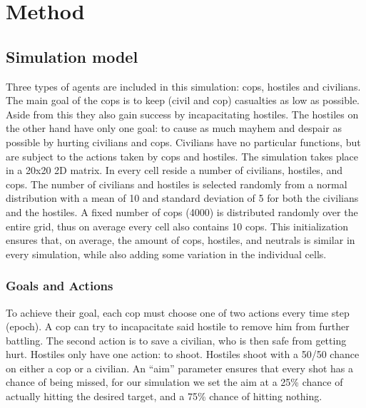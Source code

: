 \section{Method}
\subsection{Simulation model}
Three types of agents are included in this simulation: cops, hostiles and civilians.
The main goal of the cops is to keep (civil and cop) casualties as low as possible. Aside from this they also gain success by incapacitating hostiles.
The hostiles on the other hand have only one goal: to cause as much mayhem and despair as possible by hurting civilians and cops.
Civilians have no particular functions, but are subject to the actions taken by cops and hostiles.
The simulation takes place in a 20x20 2D matrix.
In every cell reside a number of civilians, hostiles, and cops.
The number of civilians and hostiles is selected randomly from a normal distribution 
with a mean of 10 and standard deviation of 5 for both the civilians and the hostiles.
A fixed number of cops (4000) is distributed randomly over the entire grid,
thus on average every cell also contains 10 cops.
This initialization ensures that, on average, the amount of cops, hostiles, and neutrals is 
similar in every simulation, while also adding some variation in the individual cells.

\subsubsection{Goals and Actions}
To achieve their goal, each cop must choose one of two actions every time step (epoch).
A cop can try to incapacitate said hostile to remove him from further battling.
The second action is to save a civilian, who is then safe from getting hurt.
Hostiles only have one action: to shoot.
Hostiles shoot with a 50/50 chance on either a cop or a civilian. 
An ``aim'' parameter ensures that every shot has a chance of being missed,
for our simulation we set the aim at a 25\% chance of actually hitting the desired target,
and a 75\% chance of hitting nothing.

